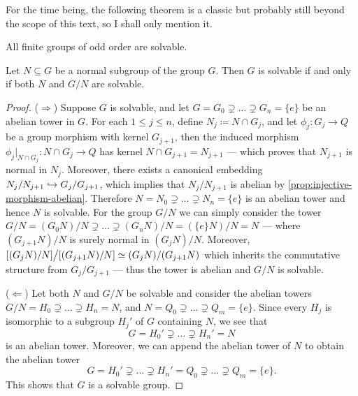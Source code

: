 For the time being, the following theorem is a classic but probably still beyond
the scope of this text, so I shall only mention it.

\begin{theorem}
    \label{thm:feit-thompson}
    All finite groups of odd order are solvable.
\end{theorem}

\begin{theorem}
    \label{thm:solvable-iff-normal-and-quotient-solvable}
    Let \(N \subseteq G\) be a normal subgroup of the group \(G\). Then \(G\) is
    solvable if and only if both \(N\) and \(G/N\) are solvable.
\end{theorem}

\begin{proof}
    (\(\Rightarrow\)) Suppose \(G\) is solvable, and let \(G = G_0 \supsetneq \dots
    \supsetneq G_n = \{e\}\) be an abelian tower in \(G\).  For each \(1 \leq j \leq
    n\), define \(N_{j} \coloneq N \cap G_j\), and let \(\phi_j: G_j \to Q\) be a
    group morphism with kernel \(G_{j+1}\), then the induced morphism \(\phi_j|_{N
    \cap G_j}: N \cap G_j \to Q\) has kernel \(N \cap G_{j+1} = N_{j+1}\) --- which
    proves that \(N_{j+1}\) is normal in \(N_j\). Moreover, there exists a canonical
    embedding \(N_j/N_{j+1} \hookrightarrow G_j/G_{j+1}\), which implies that \(N_j/N_{j+1}\)
    is abelian by \cref{prop:injective-morphism-abelian}. Therefore \(N = N_0
    \supsetneq \dots \supsetneq N_n = \{e\}\) is an abelian tower and hence \(N\) is
    solvable. For the group \(G/N\) we can simply consider the tower \(G/N = (G_0
    N)/N \supsetneq \dots \supsetneq (G_n N)/N = (\{e\} N)/N = N\) --- where
    \((G_{j+1} N)/N\) is surely normal in \((G_j N)/N\). Moreover, \([(G_j N)/N]
    \big/ [(G_{j+1} N)/N] \simeq (G_j N)/(G_{j+1} N)\) which inherits the commutative
    structure from \(G_j/G_{j+1}\) --- thus the tower is abelian and \(G/N\) is
    solvable.

    (\(\Leftarrow\)) Let both \(N\) and \(G/N\) be solvable and consider the abelian
    towers \(G/N = H_0 \supsetneq \dots \supsetneq H_n = N\), and \(N = Q_0
    \supsetneq \dots \supsetneq Q_m = \{e\}\). Since every \(H_j\) is isomorphic to
    a subgroup \(H_j'\) of \(G\) containing \(N\), we see that
    \[
        G = H_0' \supsetneq \dots \supsetneq H_n' = N
    \]
    is an abelian tower. Moreover, we can append the abelian tower of \(N\) to
    obtain the abelian tower
    \[
        G = H_0' \supsetneq \dots \supsetneq H_n'
        = Q_0 \supsetneq \dots \supsetneq Q_m = \{e\}.
    \]
    This shows that \(G\) is a solvable group.
\end{proof}

